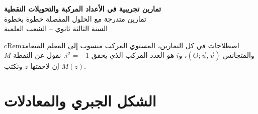 \documentclass[12pt,a4paper]{article}
\newenvironment{BOX}[2]{\begin{otherlanguage}{english}\begin{arbox}{#1}{#2}}{\end{arbox}\end{otherlanguage}}
\newenvironment{molahada}[1][ملاحظة]{\begin{BOX}{cRem}{#1}}{\end{BOX}}
\newenvironment{LTR}{\begin{otherlanguage}{english}}{\end{otherlanguage}}
\begin{document}
\begin{LTR}
\begin{tcolorbox}[enhanced,colback=cSec,colframe=cSec,arc=3mm,halign=center,boxrule=0pt,top=12pt,bottom=12pt,before upper={\selectlanguage{arabic}}]
{\color{white}\fontsize{24}{30}\selectfont\bfseries تمارين تجريبية في الأعداد المركبة والتحويلات النقطية}\\[8pt]
{\color{white}\large تمارين متدرجة مع الحلول المفصلة خطوة بخطوة}\\[5pt]
{\color{white}\large السنة الثالثة ثانوي -- الشعب العلمية}
\end{tcolorbox}
\end{LTR}
\begin{molahada}[اصطلاحات]
في كل التمارين، المستوي المركب منسوب إلى المعلم المتعامد والمتجانس $(O;\vec u,\vec v)$، و$i$ هو العدد المركب الذي يحقق $i^2=-1$. نقول عن النقطة $M$ إن لاحقتها $z$ ونكتب $M(z)$.
\end{molahada}

\section{الشكل الجبري والمعادلات}
\end{document}
